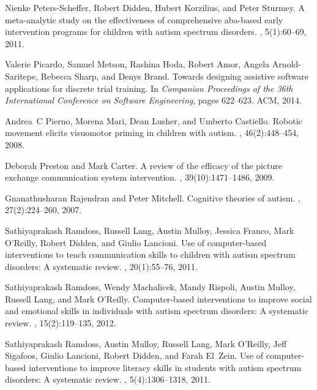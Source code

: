 \documentclass{ut-thesis}
\providecommand{\DIFaddend}{} %
\begin{document}
\begin{thebibliography}{100}
\DIFaddend {}
Nienke Peters-Scheffer, Robert Didden, Hubert Korzilius, and Peter Sturmey.
\newblock A meta-analytic study on the effectiveness of comprehensive aba-based
  early intervention programs for children with autism spectrum disorders.
, 5(1):60--69, 2011.

Valerie Picardo, Samuel Metson, Rashina Hoda, Robert Amor, Angela
  Arnold-Saritepe, Rebecca Sharp, and Denys Brand.
\newblock Towards designing assistive software applications for discrete trial
  training.
\newblock In {\em Companion Proceedings of the 36th International Conference on
  Software Engineering}, pages 622--623. ACM, 2014.

Andrea~C Pierno, Morena Mari, Dean Lusher, and Umberto Castiello.
\newblock Robotic movement elicits visuomotor priming in children with autism.
, 46(2):448--454, 2008.

Deborah Preston and Mark Carter.
\newblock A review of the efficacy of the picture exchange communication system
  intervention.
,
  39(10):1471--1486, 2009.

Gnanathusharan Rajendran and Peter Mitchell.
\newblock Cognitive theories of autism.
, 27(2):224--260, 2007.

Sathiyaprakash Ramdoss, Russell Lang, Austin Mulloy, Jessica Franco, Mark
  O’Reilly, Robert Didden, and Giulio Lancioni.
\newblock Use of computer-based interventions to teach communication skills to
  children with autism spectrum disorders: A systematic review.
, 20(1):55--76, 2011.

Sathiyaprakash Ramdoss, Wendy Machalicek, Mandy Rispoli, Austin Mulloy, Russell
  Lang, and Mark O'Reilly.
\newblock Computer-based interventions to improve social and emotional skills
  in individuals with autism spectrum disorders: A systematic review.
, 15(2):119--135, 2012.

Sathiyaprakash Ramdoss, Austin Mulloy, Russell Lang, Mark O’Reilly, Jeff
  Sigafoos, Giulio Lancioni, Robert Didden, and Farah El~Zein.
\newblock Use of computer-based interventions to improve literacy skills in
  students with autism spectrum disorders: A systematic review.
, 5(4):1306--1318, 2011.


\end{thebibliography}
\end{document}

